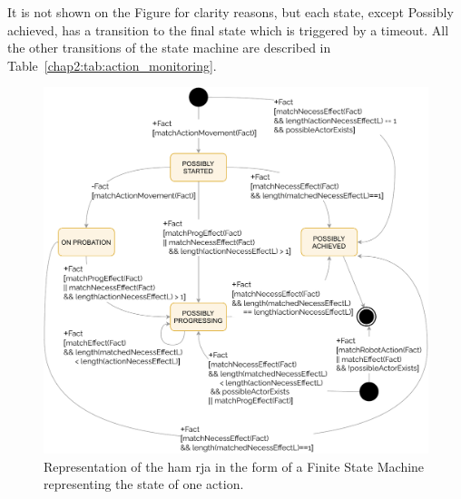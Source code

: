 \documentclass[a4paper,11pt,twoside]{StyleThese}
\begin{document}
It is not shown on the Figure for clarity reasons, but each state, except Possibly achieved, has a transition to the final state which is triggered by a timeout. All the other transitions of the state machine are described in Table~\ref{chap2:tab:action_monitoring}. 
 
\begin{figure}[!ht]
	\includegraphics[width=\linewidth]{figures/chapter2/action_sm.pdf}
	\caption{Representation of the \acrfull{ham} \acrshort{rja} in the form of a Finite State Machine representing the state of one action.}
	\label{chap2:fig:action_monitoring}
\end{figure}
\end{document}
